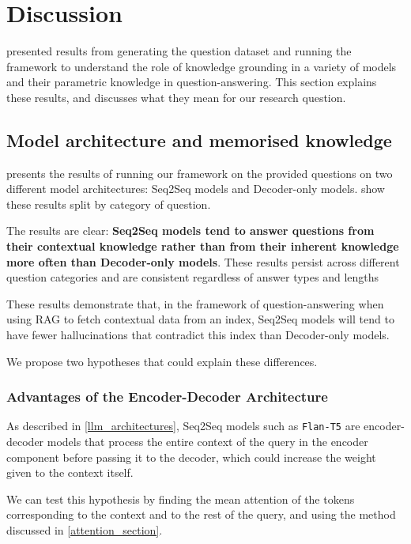 \section{Discussion}
\label{discussion}

 presented results from generating the question dataset and running the framework to understand the role of knowledge grounding in a variety of models and their parametric knowledge in question-answering.
This section explains these results, and discusses what they mean for our research question.

\subsection{Model architecture and memorised knowledge}
\label{model_architecture_parametric}

 presents the results of running our framework on the provided questions on two different model architectures: Seq2Seq models and Decoder-only models.
 show these results split by category of question.

The results are clear: \textbf{Seq2Seq models tend to answer questions from their contextual knowledge rather than from their inherent knowledge more often than Decoder-only models}.
These results persist across different question categories and are consistent regardless of answer types and lengths

These results demonstrate that, in the framework of question-answering when using RAG to fetch contextual data from an index, Seq2Seq models will tend to have fewer hallucinations that contradict this index than Decoder-only models.

We propose two hypotheses that could explain these differences.

\subsubsection{Advantages of the Encoder-Decoder Architecture}

As described in \cref{llm_architectures}, Seq2Seq models such as \texttt{Flan-T5} are encoder-decoder models that process the entire context of the query in the encoder component before passing it to the decoder, which could increase the weight given to the context itself.

We can test this hypothesis by finding the mean attention of the tokens corresponding to the context and to the rest of the query, and using the method discussed in \cref{attention_section}.

